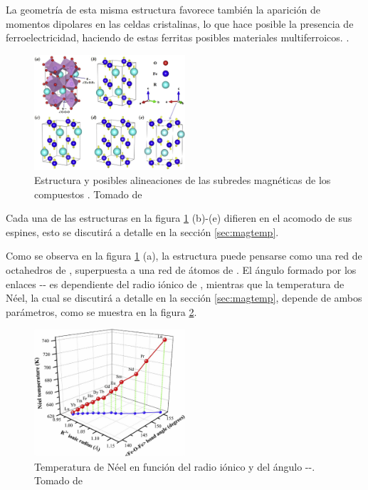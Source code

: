 \documentclass[../main.tex]{subfiles}
\begin{document}
La geometría de esta misma estructura favorece también la aparición de momentos dipolares en las celdas cristalinas, lo que hace posible la presencia de ferroelectricidad, haciendo de estas ferritas posibles materiales multiferroicos. \cite{Sharma2024}.
\begin{figure}[H]
    \centering
    \includegraphics[width=0.5\textwidth]{fig/estructura.jpg}
    \caption{Estructura y posibles alineaciones de las subredes magnéticas de los compuestos . Tomado de \cite{Wang2019}}
    \label{fig:estructuras}
\end{figure}
Cada una de las estructuras en la figura \ref{fig:estructuras} (b)-(e) difieren en el acomodo de sus espines, esto se discutirá a detalle en la sección \ref{sec:magtemp}.


Como se observa en la figura \ref{fig:estructuras} (a), la estructura puede pensarse como una red de octahedros de , superpuesta a una red de átomos de . El ángulo formado por los enlaces -- es dependiente del radio iónico de , mientras que la temperatura de Néel, la cual se discutirá a detalle en la sección \ref{sec:magtemp}, depende de ambos parámetros, como se muestra en la figura \ref{fig:neelradio}.

\begin{figure}[H]
    \centering
    \includegraphics[width=0.5\textwidth]{fig/neelradio.jpg}
    \caption{Temperatura de Néel en función del radio iónico y del ángulo --. Tomado de \cite{Wang2019}}
    \label{fig:neelradio}
\end{figure}
\end{document}

